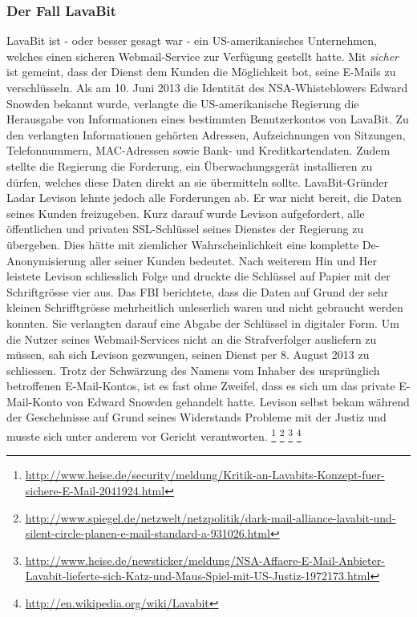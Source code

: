 \subsubsection{Der Fall LavaBit}
LavaBit ist - oder besser gesagt war - ein US-amerikanisches Unternehmen, welches einen sicheren Webmail-Service zur Verfügung gestellt hatte. Mit \textit{sicher} ist gemeint, dass der Dienst dem Kunden die Möglichkeit bot, seine E-Mails zu verschlüsseln. Als am 10. Juni 2013 die Identität des NSA-Whisteblowers Edward Snowden bekannt wurde, verlangte die US-amerikanische Regierung die Herausgabe von Informationen eines bestimmten Benutzerkontos von LavaBit. Zu den verlangten Informationen gehörten Adressen, Aufzeichnungen von Sitzungen, Telefonnummern, MAC-Adressen sowie Bank- und Kreditkartendaten. Zudem stellte die Regierung die Forderung, ein Überwachungsgerät installieren zu dürfen, welches diese Daten direkt an sie übermitteln sollte. LavaBit-Gründer Ladar Levison lehnte jedoch alle Forderungen ab. Er war nicht bereit, die Daten seines Kunden freizugeben. Kurz darauf wurde Levison aufgefordert, alle öffentlichen und privaten SSL-Schlüssel seines Dienstes der Regierung zu übergeben. Dies hätte mit ziemlicher Wahrscheinlichkeit eine komplette De-Anonymisierung aller seiner Kunden bedeutet. Nach weiterem Hin und Her leistete Levison schliesslich Folge und druckte die Schlüssel auf Papier mit der Schriftgrösse vier aus. Das FBI berichtete, dass die Daten auf Grund der sehr kleinen Schrifftgrösse mehrheitlich unleserlich waren und nicht gebraucht werden konnten. Sie verlangten darauf eine Abgabe der Schlüssel in digitaler Form. Um die Nutzer seines Webmail-Services nicht an die Strafverfolger ausliefern zu müssen, sah sich Levison gezwungen, seinen Dienst per 8. August 2013 zu schliessen. Trotz der Schwärzung des Namens vom Inhaber des ursprünglich betroffenen E-Mail-Kontos, ist es fast ohne Zweifel, dass es sich um das private E-Mail-Konto von Edward Snowden gehandelt hatte. Levison selbst bekam während der Geschehnisse auf Grund seines Widerstands Probleme mit der Justiz und musste sich unter anderem vor Gericht verantworten.
\footnote{\url{http://www.heise.de/security/meldung/Kritik-an-Lavabits-Konzept-fuer-sichere-E-Mail-2041924.html}}
\footnote{\url{http://www.spiegel.de/netzwelt/netzpolitik/dark-mail-alliance-lavabit-und-silent-circle-planen-e-mail-standard-a-931026.html}}
\footnote{\url{http://www.heise.de/newsticker/meldung/NSA-Affaere-E-Mail-Anbieter-Lavabit-lieferte-sich-Katz-und-Maus-Spiel-mit-US-Justiz-1972173.html}}
\footnote{\url{http://en.wikipedia.org/wiki/Lavabit}}

